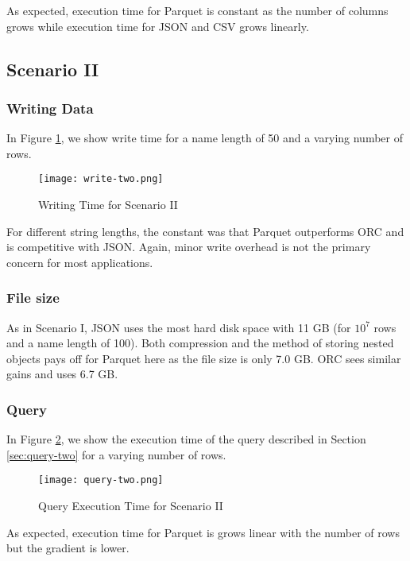 As expected, execution time for Parquet is constant as the number of columns grows while execution time for JSON and CSV grows linearly.

\subsection{Scenario II}

\subsubsection{Writing Data}
In Figure \ref{fig:write-two}, we show write time for a name length of 50 and a varying number of rows.

\begin{figure}[!htb]
\caption{Writing Time for Scenario II}
\centering
\texttt{[image: write-two.png]}
\label{fig:write-two}
\end{figure}

For different string lengths, the constant was that Parquet outperforms ORC and is competitive with JSON.
Again, minor write overhead is not the primary concern for most applications.

\subsubsection{File size}
As in Scenario I, JSON uses the most hard disk space with 11 GB (for $10^7$ rows and a name length of 100).
Both compression and the method of storing nested objects pays off for Parquet here as the file size is only 7.0 GB.
ORC sees similar gains and uses 6.7 GB.

\subsubsection{Query}
In Figure \ref{fig:query-two}, we show the execution time of the query described in Section \ref{sec:query-two} for a varying number of rows.

\begin{figure}[!htb]
\caption{Query Execution Time for Scenario II}
\centering
\texttt{[image: query-two.png]}
\label{fig:query-two}
\end{figure}

As expected, execution time for Parquet is grows linear with the number of rows but the gradient is lower.

\newpage

